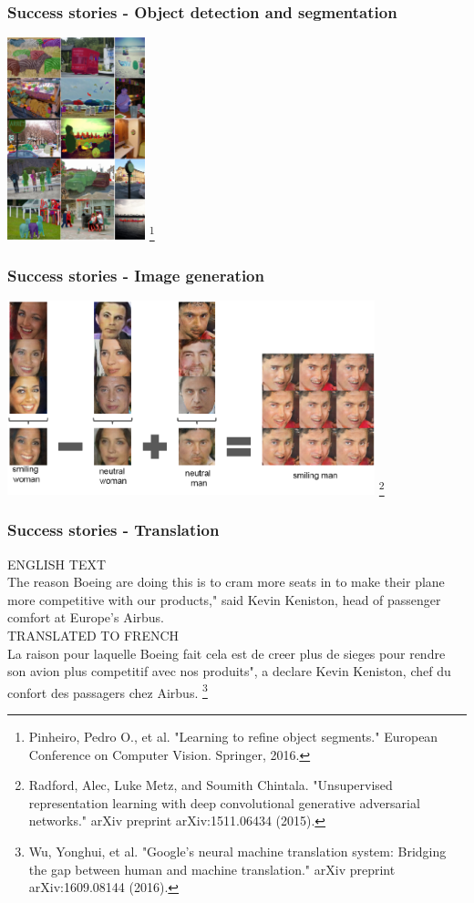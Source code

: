 \documentclass[]{article}
\newcommand\blfootnote[1]{%
  \begingroup
  \renewcommand\thefootnote{}\footnote{#1}%
  \addtocounter{footnote}{-1}%
  \endgroup
}
\begin{document}
\begin{frame}
	\frametitle{Success stories - Object detection and segmentation}
	\centering \includegraphics[width=0.3\textwidth]{objseg.pdf}\blfootnote{Pinheiro, Pedro O., et al. "Learning to refine object segments." European Conference on Computer Vision. Springer, 2016.}
\end{frame}

\begin{frame}
	\frametitle{Success stories - Image generation}
	\centering \includegraphics[width=0.8\textwidth]{imggen.pdf}\blfootnote{Radford, Alec, Luke Metz, and Soumith Chintala. "Unsupervised representation learning with deep convolutional generative adversarial networks." arXiv preprint arXiv:1511.06434 (2015).}
\end{frame}

\begin{frame}
	\frametitle{Success stories - Translation}

ENGLISH TEXT\\
The reason Boeing are doing this is to cram more seats in to make their plane
more competitive with our products," said Kevin Keniston, head of passenger
comfort at Europe's Airbus.
\\[1em]
TRANSLATED TO FRENCH\\
La raison pour laquelle Boeing fait cela est de creer plus de sieges pour rendre
son avion plus competitif avec nos produits", a declare Kevin Keniston, chef
du confort des passagers chez Airbus. \blfootnote{Wu, Yonghui, et al. "Google's neural machine translation system: Bridging the gap between human and machine translation." arXiv preprint arXiv:1609.08144 (2016).}

\end{frame}
\end{document}

